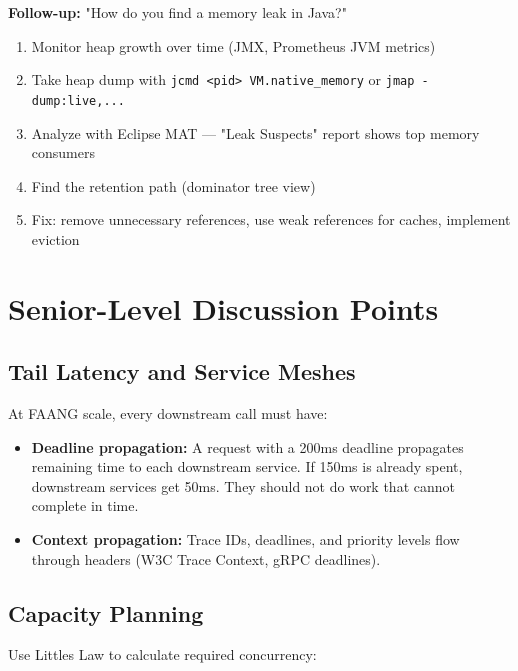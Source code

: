 \documentclass[11pt]{article}
\providecommand{\tightlist}{\setlength{\itemsep}{1pt}\setlength{\parskip}{0pt}}
\begin{document}
\textbf{Follow-up:} "How do you find a memory leak in Java?"

\begin{enumerate}
\def\labelenumi{\arabic{enumi}.}
\tightlist
\item
  Monitor heap growth over time (JMX, Prometheus JVM metrics)
\item
  Take heap dump with \texttt{jcmd\ \textless{}pid\textgreater{}\ VM.native\_memory} or \texttt{jmap\ -dump:live,...}
\item
  Analyze with Eclipse MAT --- "Leak Suspects" report shows top memory consumers
\item
  Find the retention path (dominator tree view)
\item
  Fix: remove unnecessary references, use weak references for caches, implement eviction
\end{enumerate}

\section{Senior-Level Discussion Points}\label{senior-level-discussion-points}

\subsection{Tail Latency and Service Meshes}\label{tail-latency-and-service-meshes}

At FAANG scale, every downstream call must have:

\begin{itemize}
\tightlist
\item
  \textbf{Deadline propagation:} A request with a 200ms deadline propagates remaining time to each downstream service. If 150ms is already spent, downstream services get 50ms. They should not do work that cannot complete in time.
\item
  \textbf{Context propagation:} Trace IDs, deadlines, and priority levels flow through headers (W3C Trace Context, gRPC deadlines).
\end{itemize}

\subsection{Capacity Planning}\label{capacity-planning}

Use Little\textquotesingle s Law to calculate required concurrency:

\end{document}
